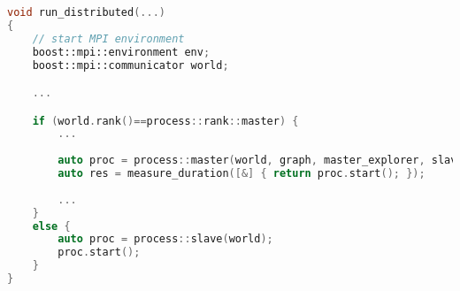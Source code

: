 \begin{lstlisting}[language=C++, label={lst:distrib:serialize}, title={Rozdělení procesů}]
void run_distributed(...)
{
    // start MPI environment
    boost::mpi::environment env;
    boost::mpi::communicator world;

    ...

    if (world.rank()==process::rank::master) {
        ...
        
        auto proc = process::master(world, graph, master_explorer, slave_explorer);
        auto res = measure_duration([&] { return proc.start(); });
        
        ...
    }
    else {
        auto proc = process::slave(world);
        proc.start();
    }
}
\end{lstlisting}



